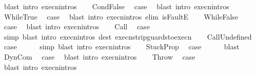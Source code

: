 \begin{isabellebody}
\ {\isacharparenleft}blast\ intro{\isacharcolon}\ execn{\isachardot}intros{\isacharparenright}\isanewline
{}\isamarkupfalse%
\isanewline
\ \ \isamarkupfalse%
\ CondFalse\ \isamarkupfalse%
\ {\isacharquery}case\ \isamarkupfalse%
\ {\isacharparenleft}blast\ intro{\isacharcolon}\ execn{\isachardot}intros{\isacharparenright}\isanewline
{}\isamarkupfalse%
\isanewline
\ \ \isamarkupfalse%
\ WhileTrue\ \isamarkupfalse%
\ {\isacharquery}case\ \isamarkupfalse%
\ {\isacharparenleft}blast\ intro{\isacharcolon}\ execn{\isachardot}intros\ elim{\isacharcolon}\ isFaultE{\isacharparenright}\isanewline
{}\isamarkupfalse%
\isanewline
\ \ \isamarkupfalse%
\ WhileFalse\ \isamarkupfalse%
\ {\isacharquery}case\ \isamarkupfalse%
\ {\isacharparenleft}blast\ intro{\isacharcolon}\ execn{\isachardot}intros{\isacharparenright}\isanewline
{}\isamarkupfalse%
\isanewline
\ \ \isamarkupfalse%
\ Call\ \isamarkupfalse%
\ {\isacharquery}case\isanewline
\ \ \ \ \isamarkupfalse%
\ simp\ {\isacharparenleft}blast\ intro{\isacharcolon}\ execn{\isachardot}intros\ dest{\isacharcolon}\ execn{\isacharunderscore}strip{\isacharunderscore}guards{\isacharunderscore}to{\isacharunderscore}execn{\isacharparenright}\isanewline
{}\isamarkupfalse%
\isanewline
\ \ \isamarkupfalse%
\ CallUndefined\ \isamarkupfalse%
\ {\isacharquery}case\isanewline
\ \ \ \ \isamarkupfalse%
\ simp\ {\isacharparenleft}blast\ intro{\isacharcolon}\ execn{\isachardot}intros{\isacharparenright}\isanewline
{}\isamarkupfalse%
\isanewline
\ \ \isamarkupfalse%
\ StuckProp\ \isamarkupfalse%
\ {\isacharquery}case\isanewline
\ \ \ \ \isamarkupfalse%
\ blast\isanewline
{}\isamarkupfalse%
\isanewline
\ \ \isamarkupfalse%
\ DynCom\ \isamarkupfalse%
\ {\isacharquery}case\ \isamarkupfalse%
\ {\isacharparenleft}blast\ intro{\isacharcolon}\ execn{\isachardot}intros{\isacharparenright}\isanewline
{}\isamarkupfalse%
\isanewline
\ \ \isamarkupfalse%
\ Throw\ \isamarkupfalse%
\ {\isacharquery}case\ \isamarkupfalse%
\ {\isacharparenleft}blast\ intro{\isacharcolon}\ execn{\isachardot}intros{\isacharparenright}\isanewline
{}\isamarkupfalse%

\end{isabellebody}
